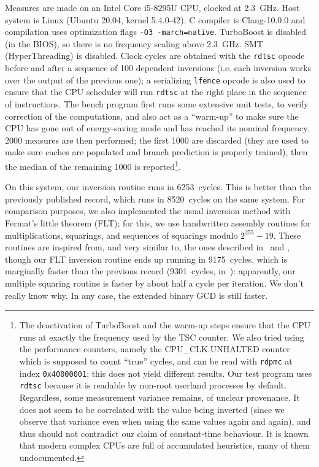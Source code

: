 \documentclass{llncs}
\begin{document}
Measures are made on an Intel Core i5-8295U CPU, clocked at 2.3~GHz.
Host system is Linux (Ubuntu 20.04, kernel 5.4.0-42). C compiler is
Clang-10.0.0 and compilation uses optimization flags
\verb+-O3 -march=native+. TurboBoost is disabled (in the BIOS), so there
is no frequency scaling above 2.3~GHz. SMT (HyperThreading) is disabled.
Clock cycles are obtained with the \verb+rdtsc+ opcode before and after
a sequence of 100 dependent inversions (i.e. each inversion works over
the output of the previous one); a serializing \verb+lfence+ opcode is
also used to ensure that the CPU scheduler will run \verb+rdtsc+ at the
right place in the sequence of instructions. The bench program first
runs some extensive unit tests, to verify correction of the
computations, and also act as a ``warm-up'' to make sure the CPU has
gone out of energy-saving mode and has reached its nominal frequency.
2000 measures are then performed; the first 1000 are discarded (they are
used to make sure caches are populated and branch prediction is properly
trained), then the median of the remaining 1000 is reported\footnote{The
deactivation of TurboBoost and the warm-up steps ensure that the CPU
runs at exactly the frequency used by the TSC counter. We also tried
using the performance counters, namely the CPU\_CLK.UNHALTED counter
which is supposed to count ``true'' cycles, and can be read with
\texttt{rdpmc} at index \texttt{0x40000001}; this does not yield
different results. Our test program uses \texttt{rdtsc} because it is
readable by non-root userland processes by default. Regardless, some
measurement variance remains, of unclear provenance. It does not seem to
be correlated with the value being inverted (since we observe that
variance even when using the same values again and again), and thus
should not contradict our claim of constant-time behaviour. It is known
that modern complex CPUs are full of accumulated heuristics, many of
them undocumented.}.

On this system, our inversion routine runs in 6253~cycles. This is
better than the previously published record\cite{BerYan2019}, which runs
in 8520~cycles on the same system. For comparison purposes, we also
implemented the usual inversion method with Fermat's little theorem
(FLT); for this, we use handwritten assembly routines for
multiplications, squarings, and sequences of squarings modulo
$2^{255}-19$. These routines are inspired from, and very similar to, the
ones described in~\cite{OliLopHisFazRod2017} and \cite{NatSar2018},
though our FLT inversion routine ends up running in 9175~cycles, which
is marginally faster than the previous record (9301~cycles,
in~\cite{NatSar2018}): apparently, our multiple squaring routine is
faster by about half a cycle per iteration. We don't really know why. In
any case, the extended binary GCD is still faster.
\end{document}
